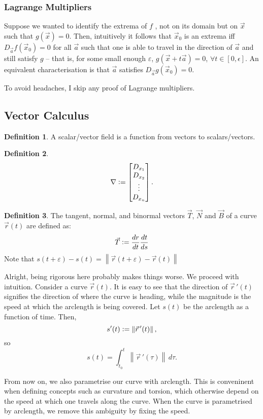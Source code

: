 \documentclass{article}
\theoremstyle{definition}
\newtheorem{defn}{Definition}[subsubsection]
\begin{document}
\subsubsection{Lagrange Multipliers}
Suppose we wanted to identify the extrema of $f$ , not on its domain but on $\vec x$ such that $g(\vec x)=0$. Then, intuitively it follows that $\vec x_0$ is an extrema iff $D_{\vec a}f(\vec x_0)=0$ for all $\vec a$ such that one is able to travel in the direction of $\vec a$ and still satisfy $g$ -- that is, for some small enough $\varepsilon$, $g(\vec x+t\vec a)=0$, $\forall t\in[0,\epsilon]$. An equivalent characterisation is that $\vec a$ satisfies $D_{\vec a}g(\vec x_0)=0$.

To avoid headaches, I skip any proof of Lagrange multipliers.

\subsection{Vector Calculus}
\begin{defn}
	A scalar/vector field is a function from vectors to scalars/vectors.
\end{defn}
\begin{defn}
	\[\nabla\vcentcolon=\begin{bmatrix}D_{x_1}\\D_{x_2}\\\vdots\\D_{x_n}\end{bmatrix}.\]
\end{defn}
\begin{defn}
	The tangent, normal, and binormal vectors $\vec T$, $\vec N$ and $\vec B$ of a curve $\vec r(t)$ are defined as:
	\begin{align*}
		\vec T\vcentcolon=\frac{dr}{dt}\frac{dt}{ds}
	\end{align*}
	Note that $s(t+\varepsilon)-s(t)=\left\lVert\vec r(t+\varepsilon)-\vec r(t)\right\rVert$
\end{defn}
Alright, being rigorous here probably makes things worse. We proceed with intuition.
Consider a curve $\vec r(t)$. It is easy to see that the direction of $\vec r\,'(t)$ signifies the direction of where the curve is heading, while the magnitude is the speed at which the arclength is being covered. Let $s(t)$ be the arclength as a function of time. Then, 
\[s'(t)\vcentcolon=\left\lVert\vec r\,'(t)\right\rVert,\] 
so 
\[s(t)=\int_{t_0}^t\left\lVert\vec r\,'(\tau)\right\rVert\,d\tau.\]\par
From now on, we also parametrise our curve with arclength. This is conveninent when defining concepts such as curvature and torsion, which otherwise depend on the speed at which one travels along the curve. When the curve is parametrised by arclength, we remove this ambiguity by fixing the speed.\par
\end{document}
